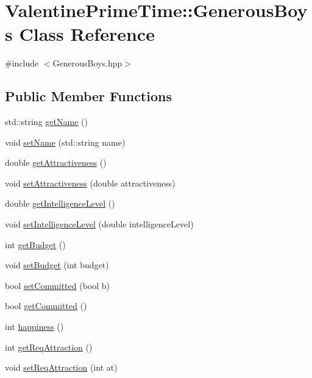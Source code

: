 \hypertarget{classValentinePrimeTime_1_1GenerousBoys}{}\section{Valentine\+Prime\+Time\+:\+:Generous\+Boys Class Reference}
\label{classValentinePrimeTime_1_1GenerousBoys}


{\ttfamily \#include $<$Generous\+Boys.\+hpp$>$}

\subsection*{Public Member Functions}
\begin{DoxyCompactItemize}
\item 
std\+::string \hyperlink{classValentinePrimeTime_1_1GenerousBoys_a681fc371c98927c6f56ce37557682dd3}{get\+Name} ()
\item 
void \hyperlink{classValentinePrimeTime_1_1GenerousBoys_af2617dc69ef73d8c6f4b609236b72d79}{set\+Name} (std\+::string name)
\item 
double \hyperlink{classValentinePrimeTime_1_1GenerousBoys_ac43244c2ede60fa83b3fdef2476fcadd}{get\+Attractiveness} ()
\item 
void \hyperlink{classValentinePrimeTime_1_1GenerousBoys_a3aac8c0df6bdf1366795d7e584cfda95}{set\+Attractiveness} (double attractiveness)
\item 
double \hyperlink{classValentinePrimeTime_1_1GenerousBoys_a66135371014278fdd3a4ceccf04b8be9}{get\+Intelligence\+Level} ()
\item 
void \hyperlink{classValentinePrimeTime_1_1GenerousBoys_acedc0ec40b4f53dac590b157859b4389}{set\+Intelligence\+Level} (double intelligence\+Level)
\item 
int \hyperlink{classValentinePrimeTime_1_1GenerousBoys_abdad37907ed9e9cfcd6be9783b6b9750}{get\+Budget} ()
\item 
void \hyperlink{classValentinePrimeTime_1_1GenerousBoys_ac97a0fc14d73c057b0028241469abbd2}{set\+Budget} (int budget)
\item 
bool \hyperlink{classValentinePrimeTime_1_1GenerousBoys_ab7dbd23d5a94c6a582d26022d53e2744}{set\+Committed} (bool b)
\item 
bool \hyperlink{classValentinePrimeTime_1_1GenerousBoys_aa57010d579dcba91069ccd3d9304ad27}{get\+Committed} ()
\item 
int \hyperlink{classValentinePrimeTime_1_1GenerousBoys_abc622283a3808904e3a93b0767c33dd0}{happiness} ()
\item 
int \hyperlink{classValentinePrimeTime_1_1GenerousBoys_a212c97cd61c3ed987df9c9c34318d416}{get\+Req\+Attraction} ()
\item 
void \hyperlink{classValentinePrimeTime_1_1GenerousBoys_ad76bf71f47634fde2ce07045a86b156a}{set\+Req\+Attraction} (int at)
\end{DoxyCompactItemize}


